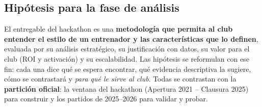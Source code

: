 \documentclass[11pt,a4paper]{article}
\begin{document}
\subsection{Hipótesis para la fase de análisis}
El entregable del hackathon es una \textbf{metodología que permita al club entender el estilo de un entrenador y las
características que lo definen}, evaluada por su análisis estratégico, su justificación con datos, su valor para el
club (ROI y activación) y su escalabilidad. Las hipótesis se reformulan con ese fin: cada una dice qué se espera
encontrar, qué evidencia descriptiva la sugiere, cómo se contrastará y \emph{para qué le sirve al club}. Todas se
contrastan con la \textbf{partición oficial}: la ventana del hackathon (Apertura 2021 -- Clausura 2025) para construir
y los partidos de 2025--2026 para validar y probar.
\end{document}
